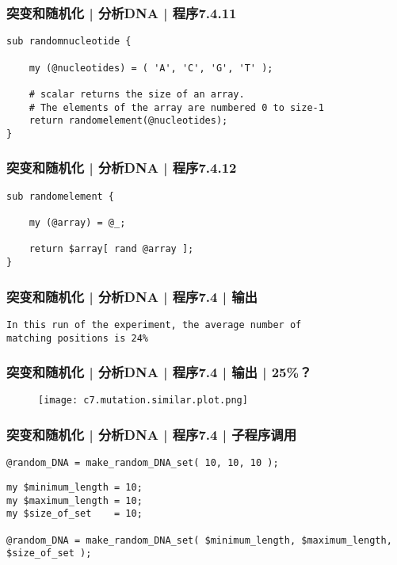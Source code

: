 \begin{frame}[fragile]
  \frametitle{突变和随机化 | 分析DNA | 程序7.4.11}
\begin{lstlisting}[firstnumber=168]
sub randomnucleotide {

    my (@nucleotides) = ( 'A', 'C', 'G', 'T' );

    # scalar returns the size of an array.
    # The elements of the array are numbered 0 to size-1
    return randomelement(@nucleotides);
}
\end{lstlisting}
\end{frame}

\begin{frame}[fragile]
  \frametitle{突变和随机化 | 分析DNA | 程序7.4.12}
\begin{lstlisting}[firstnumber=184]
sub randomelement {

    my (@array) = @_;

    return $array[ rand @array ];
}
\end{lstlisting}
\end{frame}

\begin{frame}[fragile]
  \frametitle{突变和随机化 | 分析DNA | 程序7.4 | 输出}
\begin{lstlisting}[firstnumber=1]
In this run of the experiment, the average number of 
matching positions is 24%
\end{lstlisting}
\end{frame}

\begin{frame}
  \frametitle{突变和随机化 | 分析DNA | 程序7.4 | 输出 | 25\%？}
  \begin{figure}
    \centering
    \texttt{[image: c7.mutation.similar.plot.png]}
  \end{figure}
\end{frame}

\begin{frame}[fragile]
  \frametitle{突变和随机化 | 分析DNA | 程序7.4 | 子程序调用}
\begin{lstlisting}
@random_DNA = make_random_DNA_set( 10, 10, 10 );
\end{lstlisting}
\pause
\begin{lstlisting}
my $minimum_length = 10;
my $maximum_length = 10;
my $size_of_set    = 10;

@random_DNA = make_random_DNA_set( $minimum_length, $maximum_length, $size_of_set );
\end{lstlisting}
\end{frame}

